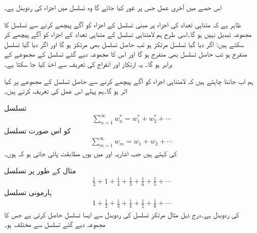 اس حصے میں آخری عمل جس پر غور کیا جائے گا وہ تسلسل  میں اجزاء کی ردوبدل ہے۔

ظاہر ہے کہ متناہی تعداد کی اجزاء پر مبنی تسلسل کے اجزاء کو آگے پیچھے کرنے سے تسلسل کا مجموعہ تبدیل نہیں ہو گا۔اسی طرح ہم لامتناہی تسلسل کے متناہی تعداد کے اجزاء کو آگے پیچھے کر سکتے ہیں: اگر دیا گیا تسلسل مرتکز ہو تب حاصل تسلسل بھی مرتکز ہو گا اور اگر دیا گیا تسلسل منفرج ہو تب حاصل تسلسل بھی منفرج ہو گا اور اس کا مجموعہ دیے گئے تسلسل کے مجموعے کے برابر ہو گا۔ یہ ارتکاز اور انفراج کی تعریف سے اخذ کیا جا سکتا ہے۔

ہم اب جاننا چاہتے ہیں کہ لامتناہی اجزاء کو آگے پیچھے کرنے سے حاصل تسلسل کے مجموعے پر کیا اثر ہو گا۔ہم پہلے  اس عمل کی تعریف کرتے ہیں۔

تسلسل
\begin{align*}
\sum\limits_{n=1}^{\infty} w^*_n=w^*_1+w^*_2+\cdots
\end{align*}
کو اس صورت تسلسل
\begin{align*}
\sum\limits_{m=1}^{\infty}w_m=w_1+w_2+\cdots
\end{align*}
کی   کہتے ہیں جب اشاریہ  اور  میں یوں مطابقت پائی جاتی ہو کہ  ہوں۔ 

مثال کے طور پر تسلسل
\begin{align*}
\frac{1}{2}+1+\frac{1}{4}+\frac{1}{3}+\frac{1}{6}+\frac{1}{5}+\cdots
\end{align*}
ہارمونی تسلسل
\begin{align*}
1+\frac{1}{2}+\frac{1}{3}+\frac{1}{4}+\frac{1}{5}+\frac{1}{6}+\cdots
\end{align*}
کی ردوبدل ہے۔درج ذیل مثال مرتکز تسلسل کی ردوبدل سے ایسا تسلسل حاصل کرتی ہے جس کا مجموعہ دیے گئے تسلسل سے مختلف ہو۔

